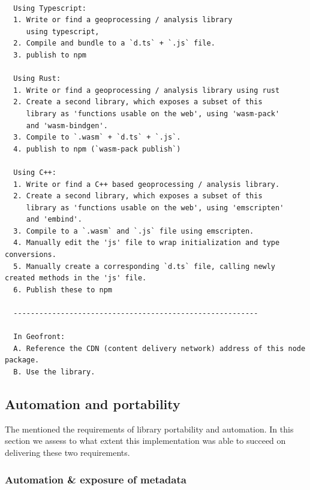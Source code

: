 \begin{lstlisting}
  
  Using Typescript: 
  1. Write or find a geoprocessing / analysis library 
     using typescript, 
  2. Compile and bundle to a `d.ts` + `.js` file.
  3. publish to npm 

  Using Rust: 
  1. Write or find a geoprocessing / analysis library using rust
  2. Create a second library, which exposes a subset of this 
     library as 'functions usable on the web', using 'wasm-pack' 
     and 'wasm-bindgen'.
  3. Compile to `.wasm` + `d.ts` + `.js`.
  4. publish to npm (`wasm-pack publish`)
  
  Using C++: 
  1. Write or find a C++ based geoprocessing / analysis library. 
  2. Create a second library, which exposes a subset of this 
     library as 'functions usable on the web', using 'emscripten' 
     and 'embind'.
  3. Compile to a `.wasm` and `.js` file using emscripten.
  4. Manually edit the 'js' file to wrap initialization and type conversions.
  5. Manually create a corresponding `d.ts` file, calling newly created methods in the 'js' file.
  6. Publish these to npm 

  ---------------------------------------------------------

  In Geofront: 
  A. Reference the CDN (content delivery network) address of this node package. 
  B. Use the library.

\end{lstlisting}


\subsection{Automation and portability}

The  mentioned the requirements of library portability and automation. 
In this section we assess to what extent this implementation was able to succeed on delivering these two requirements. 

\subsubsection*{Automation \& exposure of metadata}

